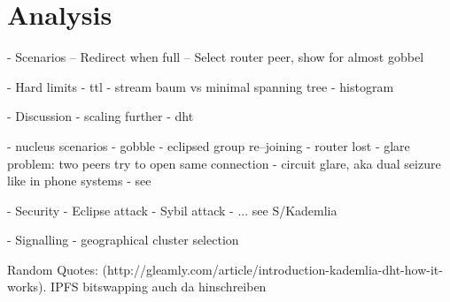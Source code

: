 \chapter{Analysis}

- Scenarios
-- Redirect when full
-- Select router peer, show for almost gobbel


- Hard limits
    - ttl
    - stream baum vs minimal spanning tree
        - histogram

- Discussion
- scaling further
    - dht

- nucleus scenarios
    - gobble
    - eclipsed group re–joining
    - router lost
    - glare problem: two peers try to open same connection
        - circuit glare, aka dual seizure like in phone systems
        - see \cite[pp. 194-194]{signaling-systems-book}


- Security
    - Eclipse attack
    - Sybil attack
    - ... see S/Kademlia

- Signalling
    - geographical cluster selection


Random Quotes:
(http://gleamly.com/article/introduction-kademlia-dht-how-it-works). IPFS bitswapping auch da hinschreiben


\newpage

\newpage

\newpage
